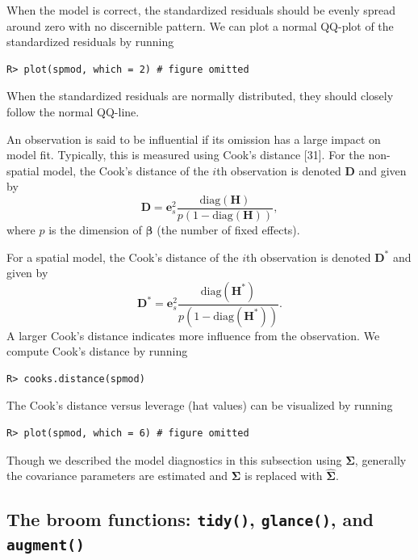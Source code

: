 \documentclass[10pt,letterpaper]{article}
\begin{document}
When the model is correct, the standardized residuals should be evenly
spread around zero with no discernible pattern. We can plot a normal
QQ-plot of the standardized residuals by running

\begin{verbatim}
R> plot(spmod, which = 2) # figure omitted
\end{verbatim}

When the standardized residuals are normally distributed, they should
closely follow the normal QQ-line.

An observation is said to be influential if its omission has a large
impact on model fit. Typically, this is measured using Cook's distance
{[}31{]}. For the non-spatial model, the Cook's distance of the \(i\)th
observation is denoted \(\mathbf{D}\) and given by \begin{equation*}
  \mathbf{D} = \mathbf{e}_{s}^2 \frac{\text{diag}(\mathbf{H})}{p(1 - \text{diag}(\mathbf{H}))},
\end{equation*} where \(p\) is the dimension of \(\boldsymbol{\beta}\)
(the number of fixed effects).

For a spatial model, the Cook's distance of the \(i\)th observation is
denoted \(\mathbf{D}^*\) and given by \begin{equation*}
  \mathbf{D}^* = \mathbf{e}_{s}^2 \frac{\text{diag}(\mathbf{H}^*)}{p(1 - \text{diag}(\mathbf{H}^*))} .
\end{equation*} A larger Cook's distance indicates more influence from
the observation. We compute Cook's distance by running

\begin{verbatim}
R> cooks.distance(spmod)
\end{verbatim}

The Cook's distance versus leverage (hat values) can be visualized by
running

\begin{verbatim}
R> plot(spmod, which = 6) # figure omitted
\end{verbatim}

Though we described the model diagnostics in this subsection using
\(\boldsymbol{\Sigma}\), generally the covariance parameters are
estimated and \(\boldsymbol{\Sigma}\) is replaced with
\(\boldsymbol{\hat{\Sigma}}\).

\hypertarget{the-broom-functions-tidy-glance-and-augment}{%
\subsection{\texorpdfstring{The broom functions: \texttt{tidy()},
\texttt{glance()}, and
\texttt{augment()}}{The broom functions: tidy(), glance(), and augment()}}\label{the-broom-functions-tidy-glance-and-augment}}
\end{document}
